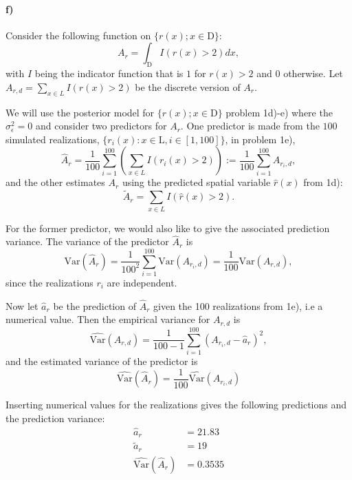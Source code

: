 \paragraph{f)}
Consider the following function on $\{r(x); x \in \text{D}\}$:
\begin{equation}
    A_r = \int_{\text{D}} I(r(x)>2)dx,
\end{equation}
with $I$ being the indicator function that is $1$ for $r(x)>2$ and $0$ otherwise. Let $A_{r,d} = \sum_{x \in L} I(r(x)>2)$ be the discrete version of $A_r$.

We will use the posterior model for $\{r(x); x \in \text{D}\}$ problem 1d)-e) where the $\sigma^2_{\epsilon} = 0$ and consider two predictors for $A_r$. One predictor is made from the $100$ simulated realizations, $\{r_i(x): x \in \text{L}, i \in [1,100]\}$, in problem 1e),
\begin{equation*}
    \hat{A}_r = \frac{1}{100}\sum_{i=1}^{100} \left(\sum_{x \in L} I(r_i(x)>2)\right) := \frac{1}{100}\sum_{i=1}^{100} A_{r_i,d},
\end{equation*}
and the other estimates $A_r$ using the predicted spatial variable $\hat{r}(x)$ from 1d):
\begin{equation*}
    \tilde{A}_r = \sum_{x \in L} I(\hat{r}(x)>2).
\end{equation*}

For the former predictor, we would also like to give the associated prediction variance. The variance of the predictor $\hat{A}_r$ is
\begin{equation*}
    \text{Var}(\hat{A}_{r}) = \frac{1}{100^2}\sum_{i=1}^{100}\text{Var}(A_{r_i,d}) = \frac{1}{100}\text{Var}(A_{r,d}),
\end{equation*}
since the realizations $r_i$ are independent.

Now let $\hat{a}_r$ be the prediction of $\hat{A}_r$ given the 100 realizations from 1e), i.e a numerical value. Then the empirical variance for $A_{r,d}$ is 
\begin{equation*}
    \hat{\text{Var}}(A_{r,d}) = \frac{1}{100-1} \sum_{i=1}^{100}  (A_{r_i,d}-\hat{a}_r)^2, 
\end{equation*}
and the estimated variance of the predictor is 
\begin{equation*}
    \hat{\text{Var}}(\hat{A}_{r}) = \frac{1}{100}\hat{\text{Var}}(A_{r_i,d})
\end{equation*}

Inserting numerical values for the realizations gives the following predictions and the prediction variance:
\begin{align*}
    \hat{a}_r & = 21.83\\
    \tilde{a}_r & = 19\\
    \hat{\text{Var}}(\hat{A}_{r}) & = 0.3535\\
\end{align*}

